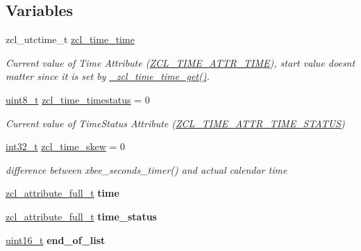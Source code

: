 \subsection*{Variables}
\begin{DoxyCompactItemize}
\item 
zcl\+\_\+utctime\+\_\+t \hyperlink{group__zcl__time_ga4e1da84a7e72ee1626d6328252fd621a}{zcl\+\_\+time\+\_\+time}
\begin{DoxyCompactList}\small\item\em Current value of Time Attribute (\hyperlink{group__zcl__time_ga6abf0e2cc70ac533ebe153a40185be63}{Z\+C\+L\+\_\+\+T\+I\+M\+E\+\_\+\+A\+T\+T\+R\+\_\+\+T\+I\+ME}), start value doesn\textquotesingle{}t matter since it is set by \hyperlink{group__zcl__time_ga9c0749b71318a4f7fd28d9112ffd5462}{\+\_\+zcl\+\_\+time\+\_\+time\+\_\+get()}. \end{DoxyCompactList}\item 
\mbox{\label{group__zcl__time_ga76f465fead960f138224d8e2a9a59469}} 
\hyperlink{group__hal__dos_gae1affc9ca37cfb624959c866a73f83c2}{uint8\+\_\+t} \hyperlink{group__zcl__time_ga76f465fead960f138224d8e2a9a59469}{zcl\+\_\+time\+\_\+timestatus} = 0
\begin{DoxyCompactList}\small\item\em Current value of Time\+Status Attribute (\hyperlink{group__zcl__time_ga5931aa648c777cb21c8337249b6e1699}{Z\+C\+L\+\_\+\+T\+I\+M\+E\+\_\+\+A\+T\+T\+R\+\_\+\+T\+I\+M\+E\+\_\+\+S\+T\+A\+T\+US}) \end{DoxyCompactList}\item 
\mbox{\label{group__zcl__time_ga999cc34fc0c4c1eb840543f1e8237d29}} 
\hyperlink{group__hal__dos_gafd12020da5a235dfcf0c3c748fb5baed}{int32\+\_\+t} \hyperlink{group__zcl__time_ga999cc34fc0c4c1eb840543f1e8237d29}{zcl\+\_\+time\+\_\+skew} = 0
\begin{DoxyCompactList}\small\item\em difference between xbee\+\_\+seconds\+\_\+timer() and actual calendar time \end{DoxyCompactList}\item 
\hyperlink{structzcl__attribute__full__t}{zcl\+\_\+attribute\+\_\+full\+\_\+t} {\bfseries time}
\item 
\hyperlink{structzcl__attribute__full__t}{zcl\+\_\+attribute\+\_\+full\+\_\+t} {\bfseries time\+\_\+status}
\item 
\hyperlink{group__hal__dos_ga5a8b2dc9e45a9ee81a94ef304fb62505}{uint16\+\_\+t} {\bfseries end\+\_\+of\+\_\+list}

\end{DoxyCompactItemize}

